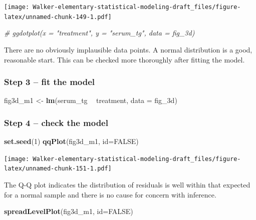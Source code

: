 \documentclass[]{book}
\newenvironment{Shaded}{\begin{snugshade}}{\end{snugshade}}
\newcommand{\CommentTok}[1]{\textcolor[rgb]{0.56,0.35,0.01}{\textit{#1}}}
\newcommand{\DataTypeTok}[1]{\textcolor[rgb]{0.13,0.29,0.53}{#1}}
\newcommand{\DecValTok}[1]{\textcolor[rgb]{0.00,0.00,0.81}{#1}}
\newcommand{\KeywordTok}[1]{\textcolor[rgb]{0.13,0.29,0.53}{\textbf{#1}}}
\newcommand{\NormalTok}[1]{#1}
\newcommand{\OperatorTok}[1]{\textcolor[rgb]{0.81,0.36,0.00}{\textbf{#1}}}
\newcommand{\OtherTok}[1]{\textcolor[rgb]{0.56,0.35,0.01}{#1}}
\newcommand{\StringTok}[1]{\textcolor[rgb]{0.31,0.60,0.02}{#1}}
\begin{document}
\texttt{[image: Walker-elementary-statistical-modeling-draft\_files/figure-latex/unnamed-chunk-149-1.pdf]}

\begin{Shaded}
\begin{Highlighting}[]
\CommentTok{# ggdotplot(x = "treatment", y = "serum_tg", data = fig_3d)}
\end{Highlighting}
\end{Shaded}

There are no obviously implausible data points. A normal distribution is a good, reasonable start. This can be checked more thoroughly after fitting the model.

\hypertarget{step-3-fit-the-model}{%
\subsubsection{Step 3 -- fit the model}\label{step-3-fit-the-model}}

\begin{Shaded}
\begin{Highlighting}[]
\NormalTok{fig3d_m1 <-}\StringTok{ }\KeywordTok{lm}\NormalTok{(serum_tg }\OperatorTok{~}\StringTok{ }\NormalTok{treatment, }\DataTypeTok{data =}\NormalTok{ fig_3d)}
\end{Highlighting}
\end{Shaded}

\hypertarget{step-4-check-the-model}{%
\subsubsection{Step 4 -- check the model}\label{step-4-check-the-model}}

\begin{Shaded}
\begin{Highlighting}[]
\KeywordTok{set.seed}\NormalTok{(}\DecValTok{1}\NormalTok{)}
\KeywordTok{qqPlot}\NormalTok{(fig3d_m1, }\DataTypeTok{id=}\OtherTok{FALSE}\NormalTok{)}
\end{Highlighting}
\end{Shaded}

\texttt{[image: Walker-elementary-statistical-modeling-draft\_files/figure-latex/unnamed-chunk-151-1.pdf]}

The Q-Q plot indicates the distribution of residuals is well within that expected for a normal sample and there is no cause for concern with inference.

\begin{Shaded}
\begin{Highlighting}[]
\KeywordTok{spreadLevelPlot}\NormalTok{(fig3d_m1, }\DataTypeTok{id=}\OtherTok{FALSE}\NormalTok{)}
\end{Highlighting}
\end{Shaded}
\end{document}
